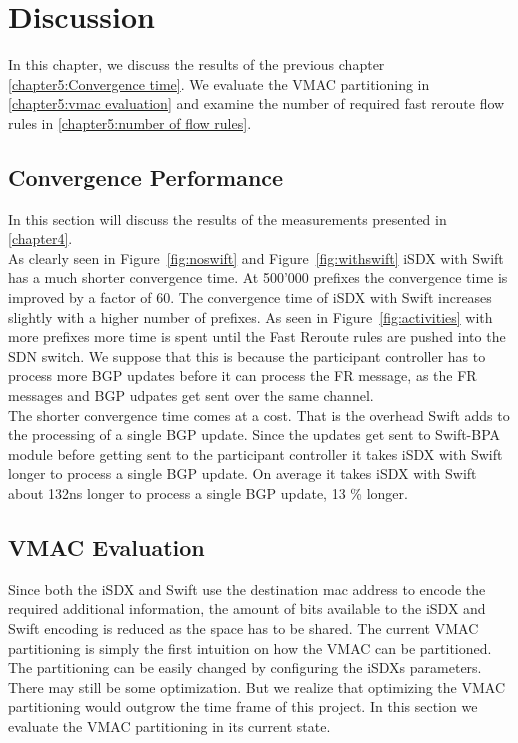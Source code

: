 \chapter{\label{chapter5}Discussion}


In this chapter, we discuss the results of the previous chapter \ref{chapter5:Convergence time}. We evaluate the VMAC partitioning in \ref{chapter5:vmac evaluation} and examine the number of required fast reroute flow rules in \ref{chapter5:number of flow rules}.

\section{\label{chapter5:Convergence time}Convergence Performance}

In this section will discuss the results of the measurements presented in \ref{chapter4}. \\
As clearly seen in Figure~\ref{fig:noswift} and Figure~\ref{fig:withswift} iSDX with Swift has a much shorter convergence time. At 500'000 prefixes the convergence time is improved by a factor of 60. The convergence time of iSDX with Swift increases slightly with a higher number of prefixes. As seen in Figure~\ref{fig:activities} with more prefixes more time is spent until the Fast Reroute rules are pushed into the SDN switch. We suppose that this is because the participant controller has to process more BGP updates before it can process the FR message, as the FR messages and BGP udpates get sent over the same channel. \\
The shorter convergence time comes at a cost. That is the overhead Swift adds to the processing of a single BGP update. Since the updates get sent to Swift-BPA module before getting sent to the participant controller it takes iSDX with Swift longer to process a single BGP update. On average it takes iSDX with Swift about 132ns longer to process a single BGP update, 13 \% longer. 


\section{\label{chapter5:vmac evaluation}VMAC Evaluation}

Since both the iSDX and Swift use the destination mac address to encode the required additional information, the amount of bits available to the iSDX and Swift encoding is reduced as the space has to be shared. The current VMAC partitioning is simply the first intuition on how the VMAC can be partitioned. The partitioning can be easily changed by configuring the iSDXs parameters. There may still be some optimization. But we realize that optimizing the VMAC partitioning would outgrow the time frame of this project. In this section we evaluate the VMAC partitioning in its current state.

